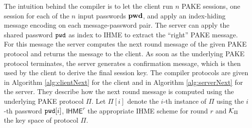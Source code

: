 \noindent{}

\noindent
The intuition behind the compiler is to let the client run $n$ \ac{PAKE} sessions, one session for each of the $n$ input passwords $\mathtt{{\bf pwd}}$, and apply an index-hiding message encoding on each message-password pair.
The server can apply the shared password $\mathtt{pwd}$ as index to \ac{IHME} to extract the ``right'' \ac{PAKE} message. 
For this message the server computes the next round message of the given \ac{PAKE} protocol and returns the message to the client.
As soon as the underlying \ac{PAKE} protocol terminates, the server generates a confirmation message, which is then used by the client to derive the final session key.
The compiler protocols are given in Algorithm \ref{alg:clientNext} for the client and in Algorithm \ref{alg:serverNext} for the server.
They describe how the next round message is computed using the underlying \ac{PAKE} protocol $\Pi$.
Let $\Pi[i]$ denote the $i$-th instance of $\Pi$ using the $i$-th password $\mathtt{pwd}[i]$, $\mathsf{IHME}^r$ the appropriate IHME scheme for round $r$ and $\mathcal{K}_\Pi$ the key space of protocol $\Pi$.

